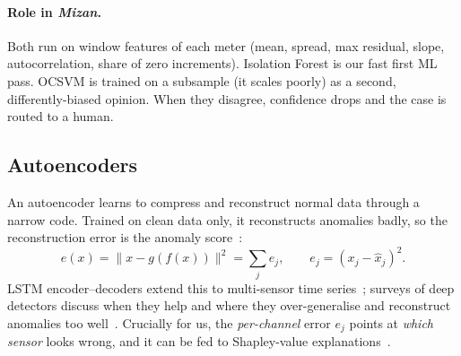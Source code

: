 \documentclass[11pt,a4paper]{article}
\providecommand{\Mizan}{\textit{Mizan}}
\begin{document}
\paragraph{Role in \Mizan.} Both run on window features of each meter (mean, spread, max residual, slope,
autocorrelation, share of zero increments). Isolation Forest is our fast first ML pass. OCSVM is trained on a
subsample (it scales poorly) as a second, differently-biased opinion. When they disagree, confidence drops
and the case is routed to a human.

\subsection{Autoencoders}
An autoencoder learns to compress and reconstruct normal data through a narrow code. Trained on clean data
only, it reconstructs anomalies badly, so the reconstruction error is the anomaly score~\cite{sakurada}:
\begin{equation}
  e(x)=\lVert x-g(f(x))\rVert^2=\textstyle\sum_j e_j,\qquad e_j=(x_j-\hat x_j)^2.
\end{equation}
LSTM encoder--decoders extend this to multi-sensor time series~\cite{malhotra}; surveys of deep detectors
discuss when they help and where they over-generalise and reconstruct anomalies too well~\cite{pang}.
Crucially for us, the \emph{per-channel} error $e_j$ points at \emph{which sensor} looks wrong, and it can be
fed to Shapley-value explanations~\cite{shap}.
\end{document}
